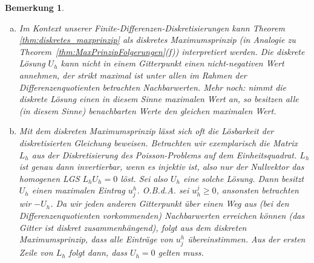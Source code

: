 \documentclass[
]{mycourse}
\theoremstyle{mythm}
\newtheorem{bemerkung}[theorem]{Bemerkung}
\theoremstyle{break}
\begin{document}
\begin{bemerkung}
\begin{enumerate}[(a)]
\item
Im Kontext unserer Finite-Differenzen-Diskretisierungen kann Theorem \ref{thm:diskretes_maxprinzip}
als \emph{diskretes Maximumsprinzip} (in Analogie zu Theorem~\ref{thm:MaxPrinzipFolgerungen}(f)) interpretiert werden.
Die diskrete Lösung $U_h$ kann nicht in einem Gitterpunkt einen nicht-negativen Wert annehmen, der strikt maximal ist unter
allen im Rahmen der Differenzenquotienten betrachten Nachbarwerten. Mehr noch: nimmt die diskrete Lösung
einen in diesem Sinne maximalen Wert an, so besitzen alle (in diesem Sinne) benachbarten Werte den gleichen maximalen Wert.
%
\item Mit dem diskreten Maximumsprinzip lässt sich oft die Lösbarkeit der diskretisierten Gleichung beweisen. Betrachten wir exemplarisch die Matrix
$L_h$ aus der Diskretisierung des Poisson-Problems auf dem Einheitsquadrat. $L_h$ ist genau dann invertierbar, 
wenn es injektiv ist,
also nur der Nullvektor das homogenen LGS $L_h U_h=0$ löst. Sei also $U_h$ eine solche Lösung. 
Dann besitzt $U_h$ einen maximalen Eintrag $u^h_j$.
O.B.d.A. sei $u_h^j\geq 0$, ansonsten betrachten wir $-U_h$. 
Da wir jeden anderen Gitterpunkt über einen Weg aus (bei den Differenzenquotienten vorkommenden)
Nachbarwerten erreichen können (das Gitter ist \emph{diskret zusammenhängend}), folgt aus dem diskreten Maximumsprinzip, dass alle Einträge von 
$u^h_j$ übereinstimmen. Aus der ersten Zeile von $L_h$ folgt dann, dass $U_h=0$ gelten muss.
\end{enumerate}
\end{bemerkung}
\end{document}
